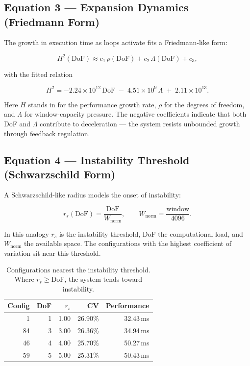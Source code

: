 \subsection{Equation 3 --- Expansion Dynamics (Friedmann Form)}

The growth in execution time as loops activate fits a Friedmann-like form:

\begin{equation}
H^2(\mathrm{DoF}) \approx c_1\,\rho(\mathrm{DoF}) + c_2\,\Lambda(\mathrm{DoF}) + c_3,
\end{equation}

with the fitted relation

\begin{equation}
H^2 = -2.24\times10^{12}\,\mathrm{DoF} \;-\; 4.51\times10^{9}\,\Lambda \;+\; 2.11\times10^{13}.
\end{equation}

Here $H$ stands in for the performance growth rate, $\rho$ for the degrees of
freedom, and $\Lambda$ for window-capacity pressure. The negative coefficients
indicate that both DoF and $\Lambda$ contribute to deceleration --- the system
resists unbounded growth through feedback regulation.

\subsection{Equation 4 --- Instability Threshold (Schwarzschild Form)}

A Schwarzschild-like radius models the onset of instability:

\begin{equation}
r_s(\mathrm{DoF}) = \frac{\mathrm{DoF}}{W_{\mathrm{norm}}},
\qquad W_{\mathrm{norm}} = \frac{\text{window}}{4096}.
\end{equation}

In this analogy $r_s$ is the instability threshold, DoF the computational load,
and $W_{\mathrm{norm}}$ the available space. The configurations with the highest
coefficient of variation sit near this threshold.

\begin{table}[ht]
\centering
\small
\begin{tabular}{rrrrr}
\toprule
Config & DoF & $r_s$ & CV & Performance \\
\midrule
1  & 1 & 1.00 & 26.90\% & 32.43\,ms \\
84 & 3 & 3.00 & 26.36\% & 34.94\,ms \\
46 & 4 & 4.00 & 25.70\% & 50.27\,ms \\
59 & 5 & 5.00 & 25.31\% & 50.43\,ms \\
\bottomrule
\end{tabular}
\caption{Configurations nearest the instability threshold. Where $r_s \ge \mathrm{DoF}$, the system tends toward instability.}
\end{table}


